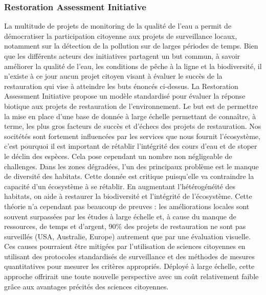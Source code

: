 \documentclass[10pt, conference, compsocconf]{llncs}
\begin{document}
		\subsubsection{Restoration Assessment Initiative}
			La multitude de projets de monitoring de la qualité de l'eau a permit de démocratiser la participation citoyenne aux projets de surveillance locaux, notamment sur la détection de la pollution sur de larges périodes de temps. Bien que les différents acteurs des initiatives partagent un but commun, à savoir améliorer la qualité de l'eau, les conditions de pêche à la ligne et la biodiversité, il n'existe à ce jour aucun projet citoyen visant à évaluer le succès de la restauration qui vise à atteindre les buts énoncés ci-dessus. La Restoration Assessment Initiative propose un modèle standardisé pour évaluer la réponse biotique aux projets de restauration de l'environnement. Le but est de permettre la mise en place d'une base de donnée à large échelle permettant de connaître, à terme, les plus gros facteurs de succès et d'échecs des projets de restauration. Nos socitétés sont fortement influencées par les services que nous fournit l'écosystème, c'est pourquoi il est important de rétablir l'intégrité des cours d'eau et de stoper le déclin des espèces. Cela pose cependant un nombre non négligeable de challenges.
			Dans les zones dégradées, l'un des principaux problème est le manque de diversité des habitats. Cette donnée est critique puisqu'elle va contraindre la capacité d'un écosystème à se rétablir. En augmentant l'hétérogénéité des habitats, on aide à restaurer la biodiversité et l'intégrité de l'écosystème. Cette théorie n'a cependant pas beaucoup de preuves : les améliorations locales sont souvent surpassées par les études à large échelle et, à cause du manque de ressources, de temps et d'argent, 90\% des projets de restauration ne sont pas surveillés (USA, Australie, Europe) autrement que par une évaluation visuelle. Ces causes pourraient être mitigées par l'utilisation de sciences citoyennes en utilisant des protocoles standardisés de surveillance et des méthodes de mesures quantitatives pour mesurer les critères appropriés. Déployé à large échelle, cette approche offrirait une toute nouvelle perspective avec un coût relativement faible grâce aux avantages précités des sciences citoyennes.\\
\end{document}
